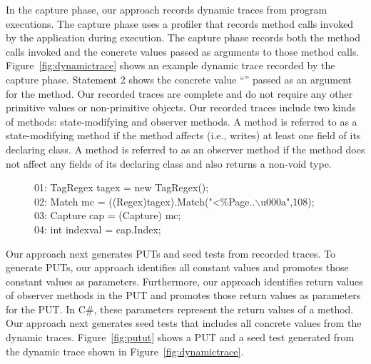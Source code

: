 In the capture phase, our approach records dynamic traces from program executions. The capture
phase uses a profiler that records method calls invoked by the application
during execution. The capture phase records both the method calls invoked and the concrete
values passed as arguments to those method calls. Figure~\ref{fig:dynamictrace} shows
an example dynamic trace recorded by the capture phase. Statement 2
shows the concrete value ``'' passed as an argument
for the  method. Our recorded traces are complete and do not 
require any other primitive values or non-primitive objects. Our recorded traces
include two kinds of methods: state-modifying and observer methods. A method
is referred to as a state-modifying method if the method affects (i.e., writes)
at least one field of its declaring class. A method is referred to as an observer
method if the method does not affect any fields of its declaring class and
also returns a non-void type.

\begin{figure}[t]
\begin{CodeOut}
01: TagRegex tagex = new TagRegex();\\
02: Match mc = ((Regex)tagex).Match("<\%\@ Page..$\backslash$u000a",108);\\
03: Capture cap = (Capture) mc;\\
04: int indexval = cap.Index;\\
\end{CodeOut}\vspace*{-3ex}
\vspace*{-1ex}
\end{figure}

Our approach next generates PUTs and seed tests from recorded traces. 
To generate PUTs, our approach identifies all constant values
and promotes those constant values as parameters. Furthermore, our approach identifies
return values of observer methods in the PUT and
promotes those return values as  parameters for the PUT. 
In C\#, these  parameters represent the return values of a method.
Our approach next generates seed tests that includes all concrete values
from the dynamic traces. Figure~\ref{fig:putut} shows a PUT and a seed test
generated from the dynamic trace shown in Figure~\ref{fig:dynamictrace}.

